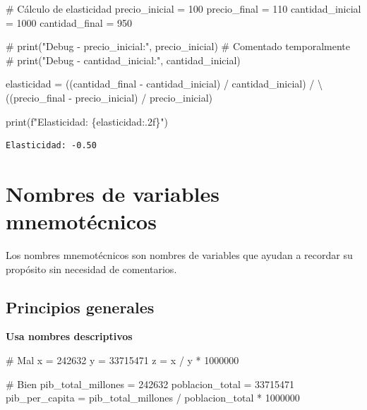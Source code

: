 \documentclass[
  doc,
  floatsintext,
  longtable,
  a4paper,
  nolmodern,
  notxfonts,
  notimes,
  12pt,
  colorlinks=true,linkcolor=blue,citecolor=blue,urlcolor=blue]{apa7}
\newenvironment{Shaded}{\begin{snugshade}}{\end{snugshade}}
\newcommand{\BuiltInTok}[1]{\textcolor[rgb]{0.00,0.23,0.31}{#1}}
\newcommand{\CommentTok}[1]{\textcolor[rgb]{0.37,0.37,0.37}{#1}}
\newcommand{\DecValTok}[1]{\textcolor[rgb]{0.68,0.00,0.00}{#1}}
\newcommand{\NormalTok}[1]{\textcolor[rgb]{0.00,0.23,0.31}{#1}}
\newcommand{\OperatorTok}[1]{\textcolor[rgb]{0.37,0.37,0.37}{#1}}
\newcommand{\SpecialCharTok}[1]{\textcolor[rgb]{0.37,0.37,0.37}{#1}}
\newcommand{\SpecialStringTok}[1]{\textcolor[rgb]{0.13,0.47,0.30}{#1}}
\begin{document}
\begin{Shaded}
\begin{Highlighting}[]
\CommentTok{\# Cálculo de elasticidad}
\NormalTok{precio\_inicial }\OperatorTok{=} \DecValTok{100}
\NormalTok{precio\_final }\OperatorTok{=} \DecValTok{110}
\NormalTok{cantidad\_inicial }\OperatorTok{=} \DecValTok{1000}
\NormalTok{cantidad\_final }\OperatorTok{=} \DecValTok{950}

\CommentTok{\# print("Debug {-} precio\_inicial:", precio\_inicial)  \# Comentado temporalmente}
\CommentTok{\# print("Debug {-} cantidad\_inicial:", cantidad\_inicial)}

\NormalTok{elasticidad }\OperatorTok{=}\NormalTok{ ((cantidad\_final }\OperatorTok{{-}}\NormalTok{ cantidad\_inicial) }\OperatorTok{/}\NormalTok{ cantidad\_inicial) }\OperatorTok{/} \OperatorTok{\textbackslash{}}
\NormalTok{              ((precio\_final }\OperatorTok{{-}}\NormalTok{ precio\_inicial) }\OperatorTok{/}\NormalTok{ precio\_inicial)}

\BuiltInTok{print}\NormalTok{(}\SpecialStringTok{f"Elasticidad: }\SpecialCharTok{\{}\NormalTok{elasticidad}\SpecialCharTok{:.2f\}}\SpecialStringTok{"}\NormalTok{)}
\end{Highlighting}
\end{Shaded}

\begin{verbatim}
Elasticidad: -0.50
\end{verbatim}

\section{Nombres de variables
mnemotécnicos}\label{nombres-de-variables-mnemotuxe9cnicos}

Los nombres mnemotécnicos son nombres de variables que ayudan a recordar
su propósito sin necesidad de comentarios.

\subsection{Principios generales}\label{principios-generales}

\textbf{Usa nombres descriptivos}

\begin{Shaded}
\begin{Highlighting}[]
\CommentTok{\# Mal}
\NormalTok{x }\OperatorTok{=} \DecValTok{242632}
\NormalTok{y }\OperatorTok{=} \DecValTok{33715471}
\NormalTok{z }\OperatorTok{=}\NormalTok{ x }\OperatorTok{/}\NormalTok{ y }\OperatorTok{*} \DecValTok{1000000}

\CommentTok{\# Bien}
\NormalTok{pib\_total\_millones }\OperatorTok{=} \DecValTok{242632}
\NormalTok{poblacion\_total }\OperatorTok{=} \DecValTok{33715471}
\NormalTok{pib\_per\_capita }\OperatorTok{=}\NormalTok{ pib\_total\_millones }\OperatorTok{/}\NormalTok{ poblacion\_total }\OperatorTok{*} \DecValTok{1000000}
\end{Highlighting}
\end{Shaded}
\end{document}
